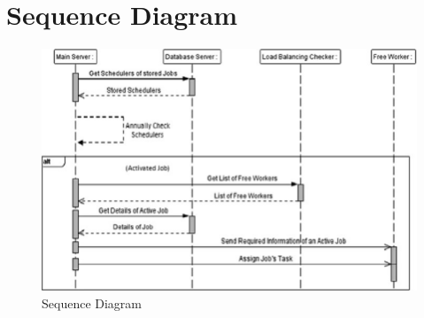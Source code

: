    \section{Sequence Diagram}
        \begin{figure}[h]
		    \centering
			    \includegraphics[width=.75\textwidth]{Images/SequenceDiagram1.png}
			    \caption{Sequence Diagram}
		\end{figure}